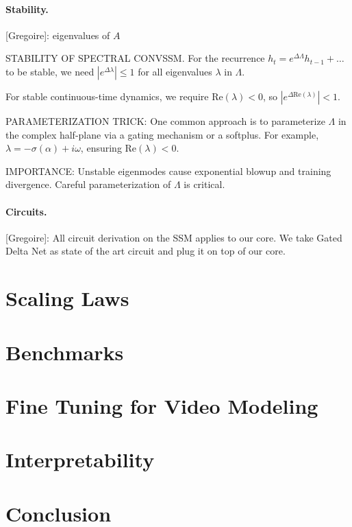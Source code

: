 \documentclass{article}
\newcommand{\greg}[1]{{\color{indigo}[Gregoire]: #1}}
\begin{document}
\paragraph{Stability.} \greg{eigenvalues of $A$}

\begin{thomasbox}
STABILITY OF SPECTRAL CONVSSM. For the recurrence $h_t = e^{\Delta \Lambda} h_{t-1} + \ldots$ to be stable, we need $|e^{\Delta \lambda}| \leq 1$ for all eigenvalues $\lambda$ in $\Lambda$.

For stable continuous-time dynamics, we require $\mathrm{Re}(\lambda) < 0$, so $|e^{\Delta \mathrm{Re}(\lambda)}| < 1$.

PARAMETERIZATION TRICK: One common approach is to parameterize $\Lambda$ in the complex half-plane via a gating mechanism or a softplus. For example, $\lambda = -\sigma(\alpha) + i \omega$, ensuring $\mathrm{Re}(\lambda) < 0$.

IMPORTANCE: Unstable eigenmodes cause exponential blowup and training divergence. Careful parameterization of $\Lambda$ is critical.
\end{thomasbox}

\paragraph{Circuits.} \greg{All circuit derivation on the SSM applies to our core. We take Gated Delta Net as state of the art circuit and plug it on top of our core.}

\section{Scaling Laws}

\section{Benchmarks}

\section{Fine Tuning for Video Modeling}

\section{Interpretability}

\section{Conclusion}
\end{document}
